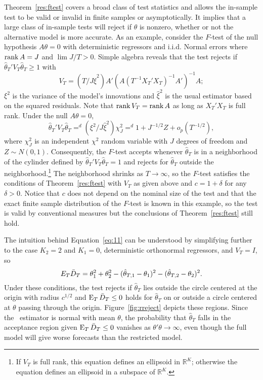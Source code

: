 \documentclass[11pt]{article}
\begin{document}
Theorem~\ref{res:ftest} covers a broad class of test statistics and
allows the in-sample test to be valid or invalid in finite samples or
asymptotically.  It implies that a large class of in-sample tests will
reject if $\theta$ is nonzero, whether or not the alternative model is
more accurate.  As an example, consider the $F$-test of the null
hypothesis $A \theta =0$ with deterministic regressors and
i.i.d. Normal errors where $\operatorname*{rank} A = J$ and $\lim J/T > 0$.  Simple
algebra reveals that the test rejects if $\hat{\theta}_T' V_T
\hat{\theta}_T \geq 1$ with
\begin{equation*}
  V_T = (T/ J \hat{\xi}^{2}) A' (A (T^{-1}X_T'X_T)^{-1} A')^{-1} A;
\end{equation*}
$\xi^2$ is the variance of the model's innovations and $\hat{\xi}^2$ is
the usual estimator based on the squared residuals.  Note that $\operatorname*{rank}
V_T = \operatorname*{rank} A$ as long as $X_T'X_T$ is full rank.  Under the null $A
\theta = 0$,
\begin{equation*}
  \hat{\theta}_T' V_T
  \hat{\theta}_T =^d   (\xi^2/ J \hat{\xi}^2) \chi_J^2 =^d 1 + J^{-1/2} Z
  + o_p(T^{-1/2}),
\end{equation*}
where $\chi_J^2$ is an independent $\chi^2$ random variable with $J$
degrees of freedom and $Z \sim N(0,1)$.  Consequently, the $F$-test
accepts whenever $\hat{\theta}_T$ is in a neighborhood of the cylinder
defined by $\hat{\theta}_T' V_T \hat{\theta}_T = 1$ and rejects for
$\hat{\theta}_T$ outside the neighborhood.\footnote{If $V_T$ is full
  rank, this equation defines an ellipsoid in $\mathbb{R}^K$;
  otherwise the equation defines an ellipsoid in a subspace of
  $\mathbb{R}^K$.}  The neighborhood shrinks as $T \to \infty$, so the
$F$-test satisfies the conditions of Theorem~\ref{res:ftest} with
$V_T$ as given above and $c = 1 + \delta$ for any $\delta > 0$.
Notice that $c$ does not depend on the nominal size of the test and
that the exact finite sample distribution of the $F$-test is known in
this example, so the test is valid by conventional measures but the
conclusions of Theorem~\ref{res:ftest} still hold.

The intuition behind Equation~\eqref{eq:11} can be understood by
simplifying further to the case $K_2 = 2$ and $K_1 = 0$, deterministic
orthonormal regressors, and $V_T = I$, so
\begin{equation*}
  E_T \bar{D}_{T} = \theta_{1}^2 + \theta_{2}^2 - (\hat{\theta}_{T,1} -
  \theta_{1})^2 - (\hat\theta_{T,2} - \theta_2)^2.
\end{equation*}
Under these conditions, the test rejects if $\hat{\theta}_{T}$ lies
outside the circle centered at the origin with radius $c^{1/2}$ and
$\operatorname{E}_T \bar{D}_{T} \leq 0$ holds for $\hat\theta_{T}$ on or outside a circle
centered at $\theta$ passing through the origin.
Figure~\ref{fig:rreject} depicts these regions.  Since the \ols\
estimator is normal with mean $\theta$, the probability that
$\hat{\theta}_{T}$ falls in the acceptance region given $\operatorname{E}_T \bar{D}_{T}
\leq 0$ vanishes as $\theta'\theta \to \infty$, even though the full
model will give worse forecasts than the restricted model.
\end{document}
